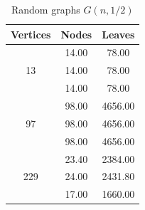 \begin{table}[h]
    \centering
    \begin{tabular}{ccc}
    \toprule
    Vertices & Nodes & Leaves \\
    \midrule
    \multirow{3}{*}{13} & 14.00 & 78.00 \\
     & 14.00 & 78.00 \\
     & 14.00 & 78.00 \\
    \cmidrule(lr){1-3}
    \multirow{3}{*}{97} & 98.00 & 4656.00 \\
     & 98.00 & 4656.00 \\
     & 98.00 & 4656.00 \\
    \cmidrule(lr){1-3}
    \multirow{3}{*}{229} & 23.40 & 2384.00 \\
     & 24.00 & 2431.80 \\
     & 17.00 & 1660.00 \\
    \bottomrule
    \end{tabular}
    \caption{Random graphs $G(n, 1/2)$}
\end{table}
